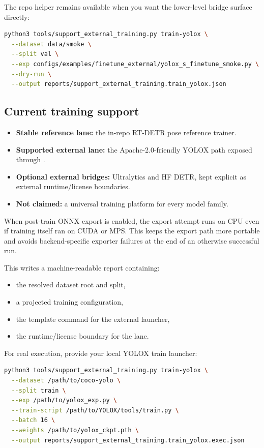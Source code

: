 The repo helper remains available when you want the lower-level bridge
surface directly:

\begin{lstlisting}[language=bash]
python3 tools/support_external_training.py train-yolox \
  --dataset data/smoke \
  --split val \
  --exp configs/examples/finetune_external/yolox_s_finetune_smoke.py \
  --dry-run \
  --output reports/support_external_training.train_yolox.json
\end{lstlisting}

\subsection{Current training support}
\begin{itemize}
  \item \textbf{Stable reference lane:} the in-repo RT-DETR pose reference trainer.
  \item \textbf{Supported external lane:} the Apache-2.0-friendly YOLOX path exposed through .
  \item \textbf{Optional external bridges:} Ultralytics and HF DETR, kept explicit as external runtime/license boundaries.
  \item \textbf{Not claimed:} a universal training platform for every model family.
\end{itemize}

When post-train ONNX export is enabled, the export attempt runs on CPU even if training itself ran on CUDA or MPS. This keeps the export path more portable and avoids backend-specific exporter failures at the end of an otherwise successful run.

This writes a machine-readable report containing:
\begin{itemize}
  \item the resolved dataset root and split,
  \item a projected training configuration,
  \item the template command for the external launcher,
  \item the runtime/license boundary for the lane.
\end{itemize}

For real execution, provide your local YOLOX train launcher:
\begin{lstlisting}[language=bash]
python3 tools/support_external_training.py train-yolox \
  --dataset /path/to/coco-yolo \
  --split train \
  --exp /path/to/yolox_exp.py \
  --train-script /path/to/YOLOX/tools/train.py \
  --batch 16 \
  --weights /path/to/yolox_ckpt.pth \
  --output reports/support_external_training.train_yolox.exec.json
\end{lstlisting}

